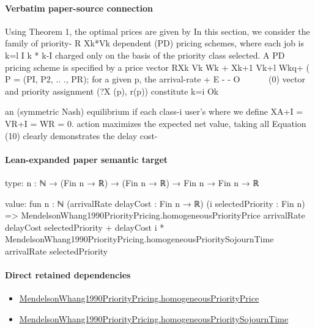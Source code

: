 \documentclass[10pt]{article}
\begin{document}
\paragraph{Verbatim paper-source connection}
\begin{ReviewVerbatim}
Using Theorem 1, the optimal prices are given by
                                                                         In this section, we consider the family of priority-
       R Xk*Vk                                                        dependent (PD) pricing schemes, where each job is
      k=l I k * k-I                                                   charged only on the basis of the priority class selected.
                                                                      A PD pricing scheme is specified by a price vector
          RXk Vk Wk + Xk+1 Vk+l Wkq+ (                                P = (PI, P2, .. ., PR); for a given p, the arrival-rate
                      + E - - O ~~~~~~(0)                             vector and priority assignment (?X (p), r(p)) constitute
          k=i         Ok

                                                                      an (symmetric Nash) equilibrium if each class-i user's
where we define XA+I = VR+I = WR = 0.
                                                                       action maximizes the expected net value, taking all
  Equation (10) clearly demonstrates the delay cost-
\end{ReviewVerbatim}



\paragraph{Lean-expanded paper semantic target}
\begin{ReviewVerbatim}
type:
{n : ℕ} → (Fin n → ℝ) → (Fin n → ℝ) → Fin n → Fin n → ℝ

value:
fun {n : ℕ} (arrivalRate delayCost : Fin n → ℝ) (i selectedPriority : Fin n) =>
  MendelsonWhang1990PriorityPricing.homogeneousPriorityPrice arrivalRate delayCost selectedPriority +
    delayCost i * MendelsonWhang1990PriorityPricing.homogeneousPrioritySojournTime arrivalRate selectedPriority
\end{ReviewVerbatim}

\paragraph{Direct retained dependencies}
\begin{itemize}\raggedright
\item \hyperlink{paper-prerequisite-3db4e2685735dcc0}{Mendelson\allowbreak{}Whang1990\allowbreak{}Priority\allowbreak{}Pricing.\allowbreak{}homogeneous\allowbreak{}Priority\allowbreak{}Price}
\item \hyperlink{paper-prerequisite-9c41d2efaf9290fc}{Mendelson\allowbreak{}Whang1990\allowbreak{}Priority\allowbreak{}Pricing.\allowbreak{}homogeneous\allowbreak{}Priority\allowbreak{}Sojourn\allowbreak{}Time}
\end{itemize}
\end{document}

